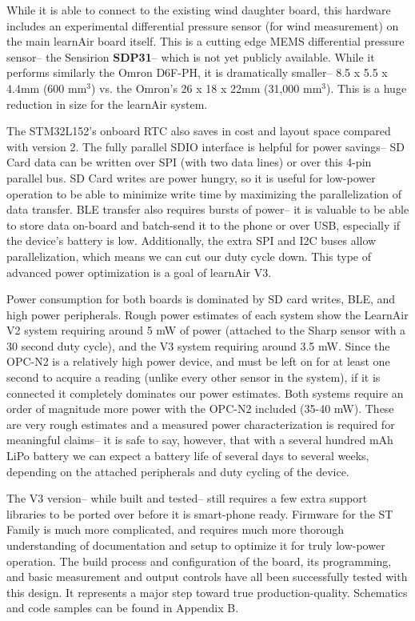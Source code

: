 While it is able to connect to the existing wind daughter board, this hardware includes an experimental differential pressure sensor (for wind measurement) on the main learnAir board itself.  This is a cutting edge MEMS differential pressure sensor-- the Sensirion \textbf{SDP31}-- which is not yet publicly available.  While it performs similarly the Omron D6F-PH, it is dramatically smaller-- 8.5 x 5.5 x 4.4mm (600 mm$^3$) vs. the Omron's 26 x 18 x 22mm (31,000 mm$^3$).  This is a huge reduction in size for the learnAir system.

The STM32L152's onboard RTC also saves in cost and layout space compared with version 2.  The fully parallel SDIO interface is helpful for power savings-- SD Card data can be written over SPI (with two data lines) or over this 4-pin parallel bus.  SD Card writes are power hungry, so it is useful for low-power operation to be able to minimize write time by maximizing the parallelization of data transfer.  BLE transfer also requires bursts of power-- it is valuable to be able to store data on-board and batch-send it to the phone or over USB, especially if the device's battery is low.  Additionally, the extra SPI and I2C buses allow parallelization, which means we can cut our duty cycle down.  This type of advanced power optimization is a goal of learnAir V3.

Power consumption for both boards is dominated by SD card writes, BLE, and high power peripherals.  Rough power estimates of each system show the LearnAir V2 system requiring around 5 mW of power (attached to the Sharp sensor with a 30 second duty cycle), and the V3 system requiring around 3.5 mW.  Since the OPC-N2 is a relatively high power device, and must be left on for at least one second to acquire a reading (unlike every other sensor in the system), if it is connected it completely dominates our power estimates.  Both systems require an order of magnitude more power with the OPC-N2 included (35-40 mW).  These are very rough estimates and a measured power characterization is required for meaningful claims-- it is safe to say, however, that with a several hundred mAh LiPo battery we can expect a battery life of several days to several weeks, depending on the attached peripherals and duty cycling of the device.      

\enlargethispage{10\baselineskip}

The V3 version-- while built and tested-- still requires a few extra support libraries to be ported over before it is smart-phone ready.  Firmware for the ST Family is much more complicated, and requires much more thorough understanding of documentation and setup to optimize it for truly low-power operation.  The build process and configuration of the board, its programming, and basic measurement and output controls have all been successfully tested with this design.  It represents a major step toward true production-quality.  Schematics and code samples can be found in Appendix B.

